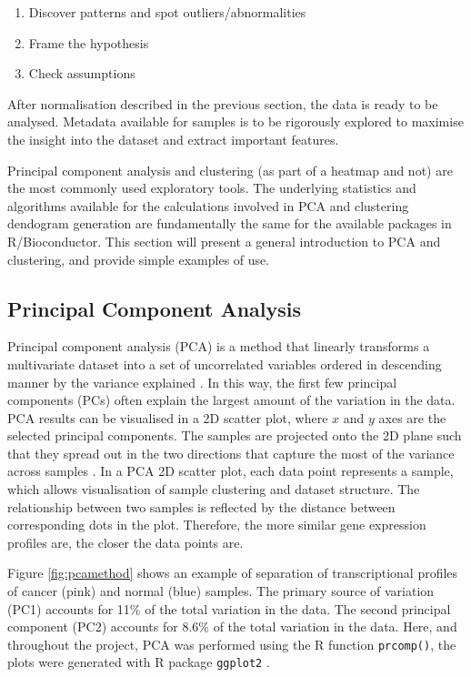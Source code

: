     \begin{enumerate}
      \item Discover patterns and spot outliers/abnormalities
      \item Frame the hypothesis
      \item Check assumptions 
    \end{enumerate}
    
    After normalisation described in the previous section, the data is ready to be analysed.  Metadata available for samples is to be rigorously explored to maximise the insight into the dataset and extract important features.
    
    Principal component analysis and clustering (as part of a heatmap and not) are the most commonly used exploratory tools. The underlying statistics and algorithms available for the calculations involved in PCA and clustering dendogram generation are fundamentally the same for the available packages in R/Bioconductor. 
    This section will present a general introduction to PCA and clustering, and provide simple examples of use.

    
    \subsection{Principal Component Analysis}
    
    Principal component analysis (PCA) is a method that linearly transforms a multivariate dataset into a set of uncorrelated variables ordered in descending manner by the variance explained \cite{jolliffe2002principal}. In this way, the first few principal components (PCs) often explain the largest amount of the variation in the data. PCA results can be visualised in a 2D scatter plot, where $x$ and $y$ axes are the selected principal components. The samples are projected onto the 2D plane such that they spread out in the two directions that capture the most of the variance across samples \cite{Love2016RNA-SeqApproved}. 
    In a PCA 2D scatter plot, each data point represents a sample, which allows visualisation of sample clustering and dataset structure.  The relationship between two samples is reflected by the distance between corresponding dots in the plot. Therefore, the more similar gene expression profiles are, the closer the data points are.    
   
    Figure \ref{fig:pcamethod} shows an example of separation of transcriptional profiles of cancer (pink) and normal (blue) samples. The primary source of variation (PC1) accounts for 11\% of the total variation in the data. The second principal component (PC2) accounts for 8.6\% of the total variation in the data. 
    Here, and throughout the project, PCA was performed using the R function \texttt{prcomp()}, the plots were generated with R package \texttt{ggplot2} \cite{ggplot2}.
    
